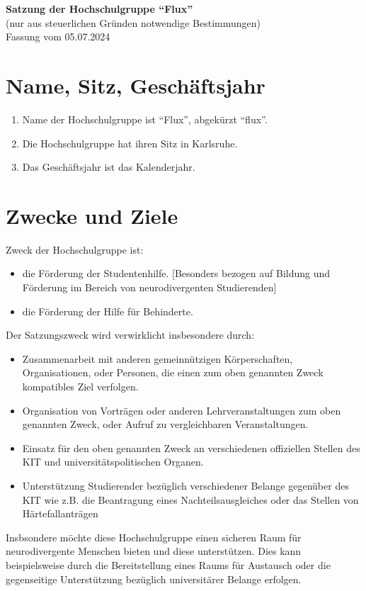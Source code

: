 \documentclass[11pt]{article}
\begin{document}
\begin{center}
	\Large
	\textbf{
		Satzung der Hochschulgruppe ``Flux''}\\
	\normalsize
	(nur aus steuerlichen Gründen notwendige Bestimmungen)\\
	\vspace{10mm}
	Fassung vom 05.07.2024
	\vspace{10mm}
\end{center}

\section{Name, Sitz, Geschäftsjahr}
\begin{enumerate}
	\item Name der Hochschulgruppe ist ``Flux'', abgekürzt ``flux''.
	\item Die Hochschulgruppe hat ihren Sitz in Karlsruhe.
	\item Das Geschäftsjahr ist das Kalenderjahr.
\end{enumerate}
\section{Zwecke und Ziele}
\label{zweck}
Zweck der Hochschulgruppe ist:
\begin{itemize}
	\item die Förderung der Studentenhilfe. [Besonders bezogen auf Bildung und Förderung im Bereich von neurodivergenten Studierenden]
	\item die Förderung der Hilfe für Behinderte.
\end{itemize}
Der Satzungszweck wird verwirklicht insbesondere durch:
\begin{itemize}
	\item Zusammenarbeit mit anderen gemeinnützigen Körperschaften, Organisationen, oder Personen, die einen zum oben genannten Zweck kompatibles Ziel verfolgen.
	\item Organisation von Vorträgen oder anderen Lehrveranstaltungen zum oben genannten Zweck, oder Aufruf zu vergleichbaren Veranstaltungen.
	\item Einsatz für den oben genannten Zweck an verschiedenen offiziellen Stellen des KIT und universitätspolitischen Organen.
	\item Unterstützung Studierender bezüglich verschiedener Belange gegenüber des KIT wie z.B. die Beantragung eines Nachteilsausgleiches oder das Stellen von Härtefallanträgen
\end{itemize}
Insbsondere möchte diese Hochschulgruppe einen sicheren Raum für neurodivergente Menschen bieten und diese unterstützen. Dies kann beispielsweise durch die Bereitstellung eines Raums für Austausch oder die gegenseitige Unterstützung bezüglich universitärer Belange erfolgen.
\end{document}
